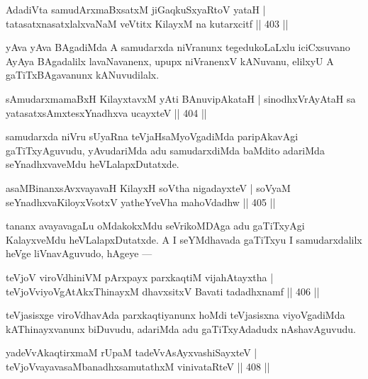 
\begin{shl}
AdadiVta samudArxmaBxsatxM jiGaqkuSxyaRtoV yataH |
tatasatxnasatxlalxvaNaM veVtitx KilayxM na kutarxcitf \hfill || 403 ||
\end{shl}

\begin{artha}
yAva yAva BAgadiMda A samudarxda niVranunx tegedukoLaLxlu iciCxsuvano AyAya BAgadalilx lavaNavanenx, upupx niVranenxV kANuvanu, elilxyU A gaTiTxBAgavanunx kANuvudilalx.
\end{artha}


\begin{shl}
sAmudarxmamaBxH KilayxtavxM yAti BAnuvipAkataH |
sinodhxVrAyAtaH sa yatasatxsAmxtesxYnadhxva ucayxteV \hfill || 404 ||
\end{shl}

\begin{artha}
samudarxda niVru sUyaRna teVjaHsaMyoVgadiMda paripAkavAgi gaTiTxyAgu\-vudu, yAvudariMda adu samudarxdiMda baMdito adariMda seYnadhxvaveMdu heVLalapxDutatxde.
\end{artha}

\begin{shl}
asaMBinanxsAvxvayavaH KilayxH soV\s tha nigadayxteV |
soV\s yaM seYnadhxvaKiloyxV\s sotxV yatheYveVha mahoVdadhw \hfill || 405 ||
\end{shl}

\begin{artha}
tananx avayavagaLu oMdakokxMdu seVrikoMDAga adu gaTiTxyAgi KalayxveMdu heVLalapxDutatxde. A I seYMdhavada gaTiTxyu I samudarxdalilx heVge liVnavAguvudo, hAgeye  {\rm ---} 
\end{artha}

\begin{shl}
teVjoV viroVdhiniVM pArxpayx parxkaqtiM vijahAtayxtha |
teVjoVviyoVgAtAkxThinayxM dhavxsitxV Bavati tadadhxnamf \hfill || 406 ||
\end{shl}

\begin{artha}
teVjasisxge viroVdhavAda parxkaqtiyanunx hoMdi teVjasisxna viyoVgadiMda kAThinayxvanunx biDuvudu, adariMda adu gaTiTxyAdadudx nAshavAguvudu.
\end{artha}

\begin{shl}
yadeVvAkaqtirxmaM rUpaM tadeVvAsAyxvashiSayxteV |
teVjoVvayavasaMbanadhxsamutathxM vinivataRteV \hfill  || 408 ||
\end{shl}

